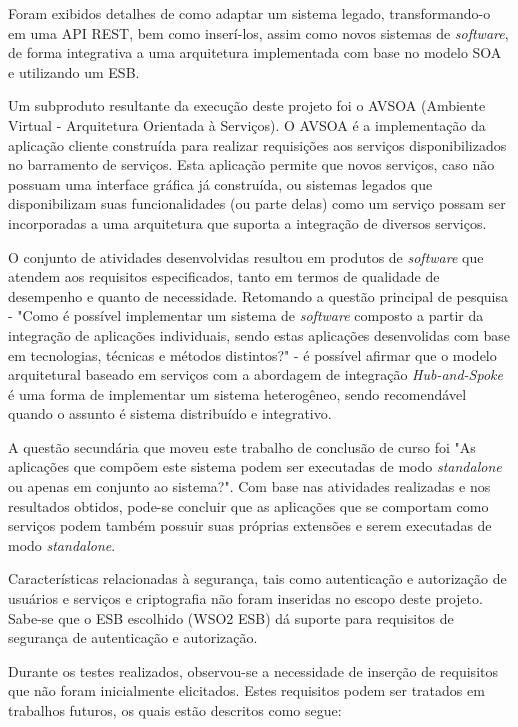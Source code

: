 Foram exibidos detalhes de como adaptar um sistema legado, transformando-o em uma API REST, bem como inserí-los, assim como novos sistemas de \textit{software}, de forma integrativa a uma arquitetura implementada com base no modelo SOA e utilizando um ESB.

Um subproduto resultante da execução deste projeto foi o AVSOA (Ambiente Virtual - Arquitetura Orientada à Serviços). O AVSOA é a implementação da aplicação cliente construída para realizar requisições aos serviços disponibilizados no barramento de serviços. Esta aplicação permite que novos serviços, caso não possuam uma interface gráfica já construída, ou sistemas legados que disponibilizam suas funcionalidades (ou parte delas) como um serviço possam ser incorporadas a uma arquitetura que suporta a integração de diversos serviços.

O conjunto de atividades desenvolvidas resultou em produtos de \textit{software} que atendem aos requisitos especificados, tanto em termos de qualidade de desempenho e quanto de necessidade. Retomando a questão principal de pesquisa - "Como é possível implementar um sistema de \textit{software} composto a partir da integração de aplicações individuais, sendo estas aplicações desenvolidas com base em tecnologias, técnicas e métodos distintos?" - é possível afirmar que o modelo arquitetural baseado em serviços com a abordagem de integração \textit{Hub-and-Spoke} é uma forma de implementar um sistema heterogêneo, sendo recomendável quando o assunto é sistema distribuído e integrativo. 

A questão secundária que moveu este trabalho de conclusão de curso foi "As aplicações que compõem este sistema podem ser executadas de modo \textit{standalone} ou apenas em conjunto ao sistema?". Com base nas atividades realizadas e nos resultados obtidos, pode-se concluir que as aplicações que se comportam como serviços podem também possuir suas próprias extensões e serem executadas de modo \textit{standalone}.

Características relacionadas à segurança, tais como autenticação e autorização de usuários e serviços e criptografia não foram inseridas no escopo deste projeto. Sabe-se que o ESB escolhido (WSO2 ESB) dá suporte para requisitos de segurança de autenticação e autorização. 

Durante os testes realizados, observou-se a necessidade de inserção de requisitos que não foram inicialmente elicitados. Estes requisitos podem ser tratados em trabalhos futuros, os quais estão descritos como segue:

